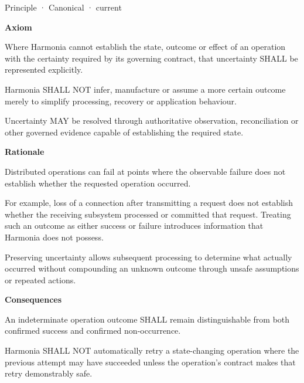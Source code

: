 \label{element:ef8abbaec37e4890ad78b9f263e67906}
{\small Principle · Canonical · current}\par

\par\medskip\textbf{Axiom}\par


Where Harmonia cannot establish the state, outcome or effect of an operation with the certainty required by its governing contract, that uncertainty SHALL be represented explicitly.



Harmonia SHALL NOT infer, manufacture or assume a more certain outcome merely to simplify processing, recovery or application behaviour.



Uncertainty MAY be resolved through authoritative observation, reconciliation or other governed evidence capable of establishing the required state.



\par\medskip\textbf{Rationale}\par


Distributed operations can fail at points where the observable failure does not establish whether the requested operation occurred.



For example, loss of a connection after transmitting a request does not establish whether the receiving subsystem processed or committed that request. Treating such an outcome as either success or failure introduces information that Harmonia does not possess.



Preserving uncertainty allows subsequent processing to determine what actually occurred without compounding an unknown outcome through unsafe assumptions or repeated actions.



\par\medskip\textbf{Consequences}\par


An indeterminate operation outcome SHALL remain distinguishable from both confirmed success and confirmed non-occurrence.



Harmonia SHALL NOT automatically retry a state-changing operation where the previous attempt may have succeeded unless the operation's contract makes that retry demonstrably safe.



